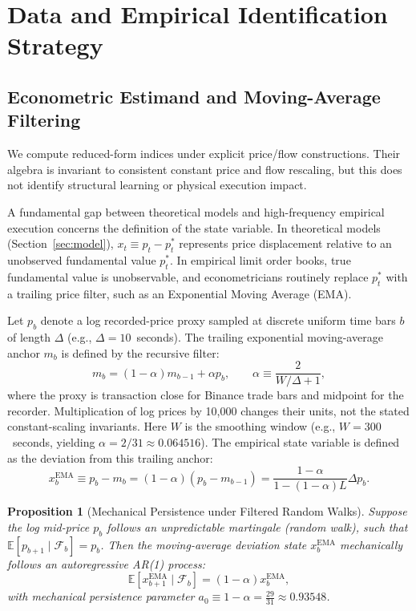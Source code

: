 \documentclass[12pt]{article}
\newtheorem{proposition}[theorem]{Proposition}
\theoremstyle{definition}
\theoremstyle{remark}
\begin{document}
\section{Data and Empirical Identification Strategy}
\label{sec:data_estimand}

\subsection{Econometric Estimand and Moving-Average Filtering}
We compute reduced-form indices under explicit price/flow constructions. Their algebra is invariant to consistent constant price and flow rescaling, but this does not identify structural learning or physical execution impact.

A fundamental gap between theoretical models and high-frequency empirical execution concerns the definition of the state variable. In theoretical models (Section~\ref{sec:model}), $x_t \equiv p_t - p_t^*$ represents price displacement relative to an unobserved fundamental value $p_t^*$. In empirical limit order books, true fundamental value is unobservable, and econometricians routinely replace $p_t^*$ with a trailing price filter, such as an Exponential Moving Average (EMA).

Let $p_b$ denote a log recorded-price proxy sampled at discrete uniform time bars $b$ of length $\Delta$ (e.g., $\Delta = 10$~seconds). The trailing exponential moving-average anchor $m_b$ is defined by the recursive filter:
\begin{equation}
m_b = (1 - \alpha) m_{b-1} + \alpha p_b, \qquad \alpha \equiv \frac{2}{W/\Delta + 1},
\label{eq:ema_def}
\end{equation}
where the proxy is transaction close for Binance trade bars and midpoint for the recorder. Multiplication of log prices by 10,000 changes their units, not the stated constant-scaling invariants. Here $W$ is the smoothing window (e.g., $W = 300$~seconds, yielding $\alpha = 2/31 \approx 0.064516$). The empirical state variable is defined as the deviation from this trailing anchor:
\begin{equation}
x_b^{\text{EMA}} \equiv p_b - m_b = (1 - \alpha)(p_b - m_{b-1}) = \frac{1 - \alpha}{1 - (1 - \alpha) L} \Delta p_b.
\label{eq:x_ema_rep}
\end{equation}

\begin{proposition}[Mechanical Persistence under Filtered Random Walks]
\label{prop:mechanical_persistence}
Suppose the log mid-price $p_b$ follows an unpredictable martingale (random walk), such that $\mathbb{E}[p_{b+1} \mid \mathcal{F}_b] = p_b$. Then the moving-average deviation state $x_b^{\text{EMA}}$ mechanically follows an autoregressive AR(1) process:
\begin{equation}
\mathbb{E}[x_{b+1}^{\text{EMA}} \mid \mathcal{F}_b] = (1 - \alpha) x_b^{\text{EMA}},
\label{eq:mechanical_ar1}
\end{equation}
with mechanical persistence parameter $a_0 \equiv 1 - \alpha = \frac{29}{31} \approx 0.93548$.
\end{proposition}
\end{document}

